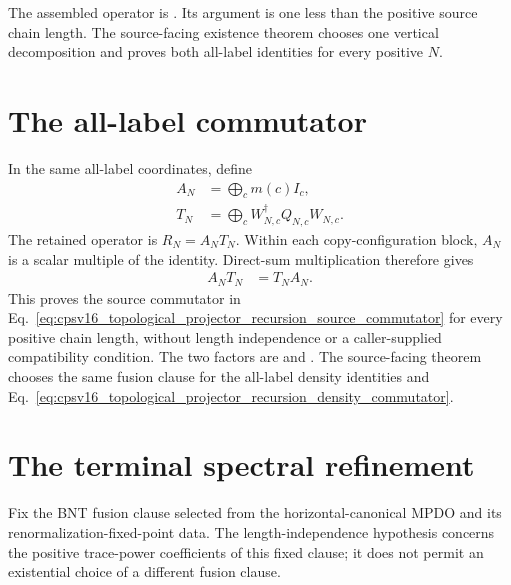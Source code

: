 \documentclass{article}
\begin{document}
The assembled operator is
. Its
argument is one less than the positive source chain length. The source-facing
existence theorem
chooses one vertical decomposition and proves both all-label identities for
every positive $N$.

\section{The all-label commutator}

In the same all-label coordinates, define
\begin{align}
    A_N
    &=\bigoplus_c m(c)I_c,
    \label{eq:cpsv16_topological_projector_recursion_multiplicity_factor}\\
    T_N
    &=\bigoplus_c W_{N,c}^\dagger Q_{N,c}W_{N,c}.
    \label{eq:cpsv16_topological_projector_recursion_recursive_factor}
\end{align}
The retained operator is $R_N=A_NT_N$. Within each copy-configuration block,
$A_N$ is a scalar multiple of the identity. Direct-sum multiplication
therefore gives
\begin{align}
    A_NT_N
    &=T_NA_N.
    \label{eq:cpsv16_topological_projector_recursion_density_commutator}
\end{align}
This proves the source commutator in
Eq.~\ref{eq:cpsv16_topological_projector_recursion_source_commutator} for
every positive chain length, without length independence or a
caller-supplied compatibility condition. The two factors are
and
.
The source-facing theorem
chooses the same fusion clause for the all-label density identities and
Eq.~\ref{eq:cpsv16_topological_projector_recursion_density_commutator}.

\section{The terminal spectral refinement}

Fix the BNT fusion clause selected from the horizontal-canonical MPDO and its
renormalization-fixed-point data. The length-independence hypothesis concerns
the positive trace-power coefficients of this fixed clause; it does not
permit an existential choice of a different fusion clause.
\end{document}
